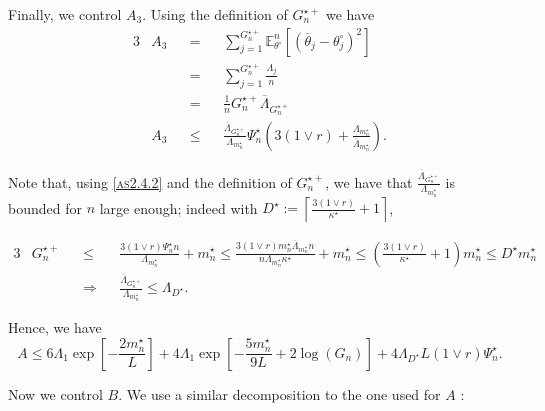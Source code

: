 \medskip

Finally, we control $A_{3}.$
Using the definition of $G_{n}^{\star+}$ we have
\begin{alignat*}{3}
& A_{3} && = && \sum\limits_{j = 1}^{G_{n}^{\star+}} \mathds{E}_{\theta^{\circ}}^{n}\left[\left(\overline{\theta}_{j} - \theta^{\circ}_{j}\right)^{2}\right]\\
& && = && \sum\limits_{j = 1}^{G_{n}^{\star+}} \frac{\Lambda_{j}}{n}\\
& && = && \frac{1}{n} G_{n}^{\star+} \overline{\Lambda}_{G_{n}^{\star+}}\\
& A_{3} && \leq && \frac{\overline{\Lambda}_{G_{n}^{\star+}}}{\Lambda_{m_{n}^{\star}}} \Psi_{n}^{\star} \left(3 \left(1 \vee r\right) + \frac{\Lambda_{m_{n}^{\star}}}{\overline{\Lambda}_{m_{n}^{\star}}}\right).
\end{alignat*}

Note that, using \textsc{\cref{as2.4.2}} and the definition of $G_{n}^{\star+}$, we have that $\frac{\overline{\Lambda}_{G_{n}^{\star+}}}{\Lambda_{m_{n}^{\star}}}$ is bounded for $n$ large enough; indeed with $D^{\star} := \left\lceil \frac{3 \left( 1 \vee r \right) }{\kappa^{\star}} + 1\right\rceil$,

\begin{alignat*}{3}
& G_{n}^{\star+} && \leq && \frac{3 \left(1 \vee r \right) \Psi_{n}^{\star} n}{\Lambda_{m_{n}^{\star}}} + m_{n}^{\star} \leq \frac{3 \left(1 \vee r \right) m_{n}^{\star} \overline{\Lambda}_{m_{n}^{\star}} n}{ n\Lambda_{m_{n}^{\star}} \kappa^{\star}} + m_{n}^{\star} \leq \left(\frac{3\left(1 \vee r \right)}{\kappa^{\star}} + 1\right) m_{n}^{\star} \leq D^{\star} m_{n}^{\star}\\ 
& && \Rightarrow && \frac{\overline{\Lambda}_{G_{n}^{\star+}}}{\Lambda_{m_{n}^{\star}}}\leq \Lambda_{D^{\star}}.
\end{alignat*}

\medskip

Hence, we have
\[A \leq 6 \Lambda_{1} \exp\left[- \frac{2 m_{n}^{\star}}{L}\right] + 4 \Lambda_{1} \exp\left[-\frac{5 m_{n}^{\star}}{9 L} + 2 \log \left(G_{n}\right)\right] +  4 \Lambda_{D^{\star}} L \left(1 \vee r\right) \Psi_{n}^{\star}.\]

\bigskip

Now we control $B$.
We use a similar decomposition to the one used for $A$ :

